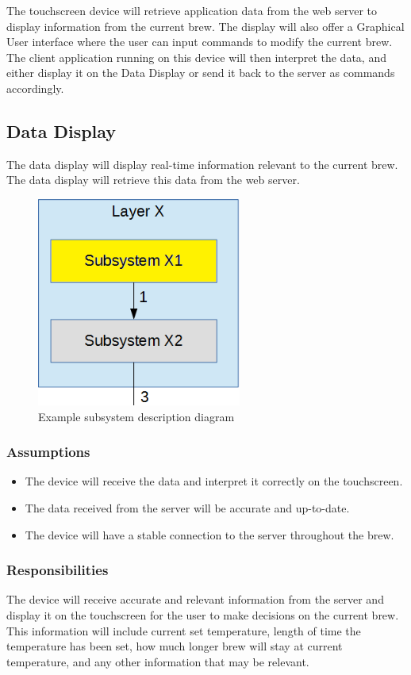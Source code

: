 The touchscreen device will retrieve application data from the web server to display information from the current brew.  The display will also offer a Graphical User interface where the user can input commands to modify the current brew. The client application running on this device will then interpret the data, and either display it on the Data Display or send it back to the server as commands accordingly.

\subsection{Data Display}
The data display will display real-time information relevant to the current brew. The data display will retrieve this data from the web server.

\begin{figure}[h!]
	\centering
 	\includegraphics[width=0.60\textwidth]{images/subsystem}
 \caption{Example subsystem description diagram}
\end{figure}

\subsubsection{Assumptions}
\begin {itemize}
\item The device will receive the data and interpret it correctly on the touchscreen.
\item The data received from the server will be accurate and up-to-date.
\item The device will have a stable connection to the server throughout the brew.
\end {itemize}


\subsubsection{Responsibilities}
The device will receive accurate and relevant information from the server and display it on the touchscreen for the user to make decisions on the current brew. This information will include current set temperature, length of time the temperature has been set, how much longer brew will stay at current temperature, and any other information that may be relevant.

